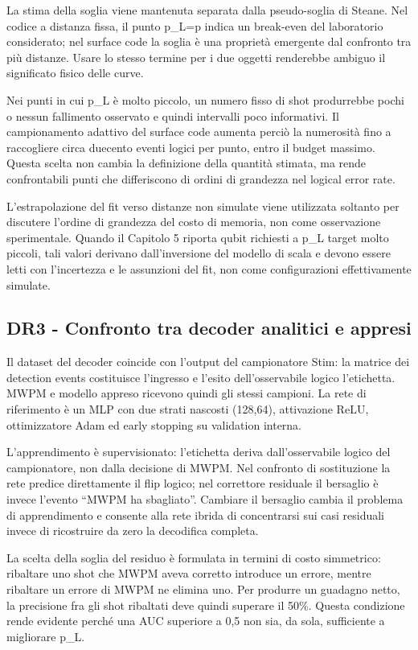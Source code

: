 La stima della soglia viene mantenuta separata dalla pseudo-soglia di Steane. Nel codice a distanza fissa, il punto p\_L=p indica un break-even del laboratorio considerato; nel surface code la soglia è una proprietà emergente dal confronto tra più distanze. Usare lo stesso termine per i due oggetti renderebbe ambiguo il significato fisico delle curve.

Nei punti in cui p\_L è molto piccolo, un numero fisso di shot produrrebbe pochi o nessun fallimento osservato e quindi intervalli poco informativi. Il campionamento adattivo del surface code aumenta perciò la numerosità fino a raccogliere circa duecento eventi logici per punto, entro il budget massimo. Questa scelta non cambia la definizione della quantità stimata, ma rende confrontabili punti che differiscono di ordini di grandezza nel logical error rate.

L'estrapolazione del fit verso distanze non simulate viene utilizzata soltanto per discutere l'ordine di grandezza del costo di memoria, non come osservazione sperimentale. Quando il Capitolo 5 riporta qubit richiesti a p\_L target molto piccoli, tali valori derivano dall'inversione del modello di scala e devono essere letti con l'incertezza e le assunzioni del fit, non come configurazioni effettivamente simulate.

\subsection{DR3 - Confronto tra decoder analitici e appresi}\label{sec:finale_3_5_4}

Il dataset del decoder coincide con l'output del campionatore Stim: la matrice dei detection events costituisce l'ingresso e l'esito dell'osservabile logico l'etichetta. MWPM e modello appreso ricevono quindi gli stessi campioni. La rete di riferimento è un MLP con due strati nascosti (128,64), attivazione ReLU, ottimizzatore Adam ed early stopping su validation interna.

L'apprendimento è supervisionato: l'etichetta deriva dall'osservabile logico del campionatore, non dalla decisione di MWPM. Nel confronto di sostituzione la rete predice direttamente il flip logico; nel correttore residuale il bersaglio è invece l'evento ``MWPM ha sbagliato''. Cambiare il bersaglio cambia il problema di apprendimento e consente alla rete ibrida di concentrarsi sui casi residuali invece di ricostruire da zero la decodifica completa.

La scelta della soglia del residuo è formulata in termini di costo simmetrico: ribaltare uno shot che MWPM aveva corretto introduce un errore, mentre ribaltare un errore di MWPM ne elimina uno. Per produrre un guadagno netto, la precisione fra gli shot ribaltati deve quindi superare il 50\%. Questa condizione rende evidente perché una AUC superiore a 0,5 non sia, da sola, sufficiente a migliorare p\_L.

